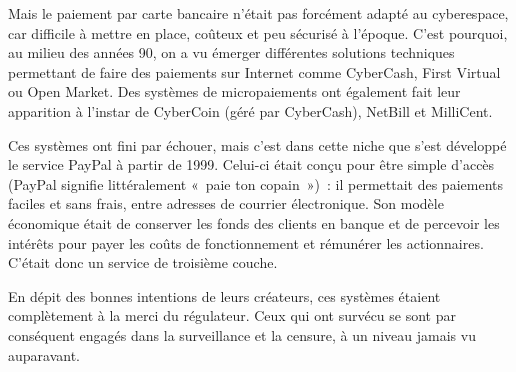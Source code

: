 Mais le paiement par carte bancaire n'était pas forcément adapté au cyberespace, car difficile à mettre en place, coûteux et peu sécurisé à l'époque. C'est pourquoi, au milieu des années 90, on a vu émerger différentes solutions techniques permettant de faire des paiements sur Internet comme CyberCash, First Virtual ou Open Market. Des systèmes de micropaiements ont également fait leur apparition à l'instar de CyberCoin (géré par CyberCash), NetBill et MilliCent.


Ces systèmes ont fini par échouer, mais c'est dans cette niche que s'est développé le service PayPal à partir de 1999. Celui-ci était conçu pour être simple d'accès (PayPal signifie littéralement «~paie ton copain~»)~: il permettait des paiements faciles et sans frais, entre adresses de courrier électronique. Son modèle économique était de conserver les fonds des clients en banque et de percevoir les intérêts pour payer les coûts de fonctionnement et rémunérer les actionnaires. C'était donc un service de troisième couche.

En dépit des bonnes intentions de leurs créateurs, ces systèmes étaient complètement à la merci du régulateur. Ceux qui ont survécu se sont par conséquent engagés dans la surveillance et la censure, à un niveau jamais vu auparavant.

